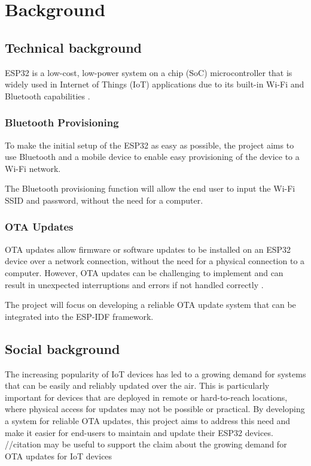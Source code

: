 \section{Background}
\label{sec:background}

\subsection{Technical background}
\label{sec:technical}
ESP32 is a low-cost, low-power system on a chip (SoC) microcontroller that is widely used in Internet of Things (IoT) applications due to its built-in Wi-Fi and Bluetooth capabilities \cite{espressif:popularity} \cite{espressif:esp32_datasheet}.

\subsubsection{Bluetooth Provisioning}
\label{subsec:bluetooth}
To make the initial setup of the ESP32 as easy as possible, the project aims to use Bluetooth and a mobile device to enable easy provisioning of the device to a Wi-Fi network.

The Bluetooth provisioning function will allow the end user to input the Wi-Fi SSID and password, without the need for a computer.

\subsubsection{OTA Updates}
\label{subsec:ota}
OTA updates allow firmware or software updates to be installed on an ESP32 device over a network connection, without the need for a physical connection to a computer. However, OTA updates can be challenging to implement and can result in unexpected interruptions and errors if not handled correctly \cite{Arakadakis:2021}.

The project will focus on developing a reliable OTA update system that can be integrated into the ESP-IDF framework.

\subsection{Social background}
\label{sec:social}
The increasing popularity of IoT devices has led to a growing demand for systems that can be easily and reliably updated over the air. This is particularly important for devices that are deployed in remote or hard-to-reach locations, where physical access for updates may not be possible or practical. By developing a system for reliable OTA updates, this project aims to address this need and make it easier for end-users to maintain and update their ESP32 devices. //citation may be useful to support the claim about the growing demand for OTA updates for IoT devices

